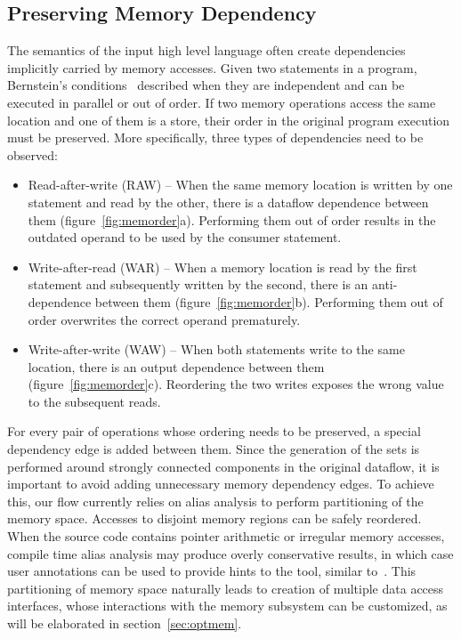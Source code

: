 \subsection{Preserving Memory Dependency }
\label{subsec:pmd}
The semantics of the input high level language often create
dependencies implicitly carried by memory accesses.
Given two statements in a program, Bernstein's conditions~\cite{4038883} described when
they are independent and can be executed in parallel or out of order.
If two memory operations access the same location and one of them is a store, their order in the original program execution must be preserved. More specifically, three types of dependencies need to be observed:
\begin{itemize}
    \item Read-after-write (RAW) -- When the same memory location is written by one statement and read by the other, there is a dataflow dependence between them (figure~\ref{fig:memorder}a). Performing them out of order results in the outdated operand to be used by the consumer statement. 
    
    \item Write-after-read (WAR) -- When a memory location is read by the first statement and subsequently written by the second, there is an anti-dependence between them (figure~\ref{fig:memorder}b). Performing them out of order overwrites
    the correct operand prematurely. 
    \item Write-after-write (WAW) -- When both statements write to the same location, there is an output dependence between them (figure~\ref{fig:memorder}c). Reordering the two
    writes exposes the wrong value to the subsequent reads.
\end{itemize}
 For every pair of operations whose ordering needs to be preserved, a special dependency edge is added between them. Since the generation of the sets is performed around strongly connected components in the original dataflow, it is important to avoid adding unnecessary memory dependency edges. To achieve this, our flow currently relies on alias analysis to perform partitioning of the memory space. Accesses to disjoint memory regions can be safely reordered. When the source code contains pointer arithmetic or irregular memory accesses, compile time alias analysis may produce overly conservative results, in which case user annotations can be used to provide hints to the tool, similar to~\cite{manycache}. This partitioning of memory space naturally leads to creation of multiple data access interfaces, whose interactions with the memory subsystem can be customized, as will be elaborated in section~\ref{sec:optmem}.  



